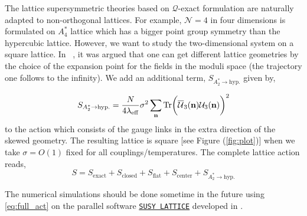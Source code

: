 The lattice supersymmetric theories based on $\mathcal{Q}$-exact formulation are naturally adapted to non-orthogonal lattices. 
For example,  $\mathcal{N} = 4$ in four dimensions is formulated on $A_{4}^{*}$ lattice which has a bigger point group symmetry than the hypercubic lattice. However, we want to study the two-dimensional 
system on a square lattice. In ~\cite{Unsal:2005yh}, it was argued that one can get different lattice geometries by the choice of the expansion point for the fields in the moduli space (the trajectory one follows to the infinity). We add an additional term, $ S_{A_{2}^{*} \to \text{hyp.}}$ given by, 

\begin{equation}
  \label{eq:hypercubic}
  S_{A_{2}^{*} \to \text{hyp.}} = \frac{N}{4\lambda_{\mathrm{eff}}} \sigma^2 \sum_{\textbf{n}} \mathrm{Tr}{\bigg({\overline{\cal U}}_3(\textbf{n}) \mathcal U_3(\textbf{n})\bigg)^2}
\end{equation}
to the action which consists of the gauge links in the extra direction of the skewed geometry. The resulting lattice 
is square [see Figure (\ref{fig:plot})] when we take $\sigma = O(1)$ fixed for all couplings/temperatures.
The complete lattice action reads,  
\begin{equation}
S = S_{\mathrm{exact}} + S_{\mathrm{closed}} +  S_{\text{flat}} + S_{\text{center}}  + S_{A_{2}^{*} \to \text{hyp.}}
  \label{eq:full_act}
\end{equation}

The numerical simulations should be done sometime in the future using \ref{eq:full_act} on the parallel software \href{https://github.com/daschaich/susy/}{{\texttt{SUSY LATTICE}}}
developed in \cite{Schaich:2014pda}. 




 
